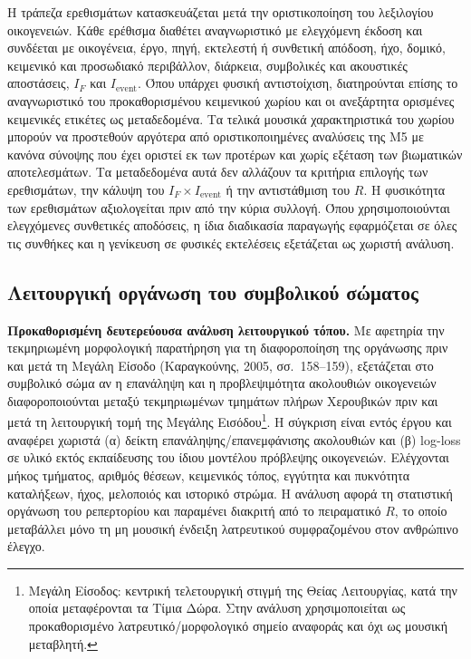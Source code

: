 \documentclass[11pt,a4paper]{article}
\begin{document}
Η τράπεζα ερεθισμάτων κατασκευάζεται μετά την οριστικοποίηση του λεξιλογίου οικογενειών. Κάθε ερέθισμα διαθέτει αναγνωριστικό με ελεγχόμενη έκδοση και συνδέεται με οικογένεια, έργο, πηγή, εκτελεστή ή συνθετική απόδοση, ήχο, δομικό, κειμενικό και προσωδιακό περιβάλλον, διάρκεια, συμβολικές και ακουστικές αποστάσεις, $I_F$ και $I_{\mathrm{event}}$. Όπου υπάρχει φυσική αντιστοίχιση, διατηρούνται επίσης το αναγνωριστικό του προκαθορισμένου κειμενικού χωρίου και οι ανεξάρτητα ορισμένες κειμενικές ετικέτες ως μεταδεδομένα. Τα τελικά μουσικά χαρακτηριστικά του χωρίου μπορούν να προστεθούν αργότερα από οριστικοποιημένες αναλύσεις της M5 με κανόνα σύνοψης που έχει οριστεί εκ των προτέρων και χωρίς εξέταση των βιωματικών αποτελεσμάτων. Τα μεταδεδομένα αυτά δεν αλλάζουν τα κριτήρια επιλογής των ερεθισμάτων, την κάλυψη του $I_F\times I_{\mathrm{event}}$ ή την αντιστάθμιση του $R$. Η φυσικότητα των ερεθισμάτων αξιολογείται πριν από την κύρια συλλογή. Όπου χρησιμοποιούνται ελεγχόμενες συνθετικές αποδόσεις, η ίδια διαδικασία παραγωγής εφαρμόζεται σε όλες τις συνθήκες και η γενίκευση σε φυσικές εκτελέσεις εξετάζεται ως χωριστή ανάλυση.

\subsection{Λειτουργική οργάνωση του συμβολικού σώματος}\label{app:human-functional}

\textbf{Προκαθορισμένη δευτερεύουσα ανάλυση λειτουργικού τόπου.} Με αφετηρία την τεκμηριωμένη μορφολογική παρατήρηση για τη διαφοροποίηση της οργάνωσης πριν και μετά τη Μεγάλη Είσοδο (Καραγκούνης, 2005, σσ.~158--159), εξετάζεται στο συμβολικό σώμα αν η επανάληψη και η προβλεψιμότητα ακολουθιών οικογενειών διαφοροποιούνται μεταξύ τεκμηριωμένων τμημάτων πλήρων Χερουβικών πριν και μετά τη λειτουργική τομή της Μεγάλης Εισόδου\footnote{Μεγάλη Είσοδος: κεντρική τελετουργική στιγμή της Θείας Λειτουργίας, κατά την οποία μεταφέρονται τα Τίμια Δώρα. Στην ανάλυση χρησιμοποιείται ως προκαθορισμένο λατρευτικό/μορφολογικό σημείο αναφοράς και όχι ως μουσική μεταβλητή.}. Η σύγκριση είναι εντός έργου και αναφέρει χωριστά (α) δείκτη επανάληψης/επανεμφάνισης ακολουθιών και (β) log-loss σε υλικό εκτός εκπαίδευσης του ίδιου μοντέλου πρόβλεψης οικογενειών. Ελέγχονται μήκος τμήματος, αριθμός θέσεων, κειμενικός τόπος, εγγύτητα και πυκνότητα καταλήξεων, ήχος, μελοποιός και ιστορικό στρώμα. Η ανάλυση αφορά τη στατιστική οργάνωση του ρεπερτορίου και παραμένει διακριτή από το πειραματικό $R$, το οποίο μεταβάλλει μόνο τη μη μουσική ένδειξη λατρευτικού συμφραζομένου στον ανθρώπινο έλεγχο.
\end{document}
